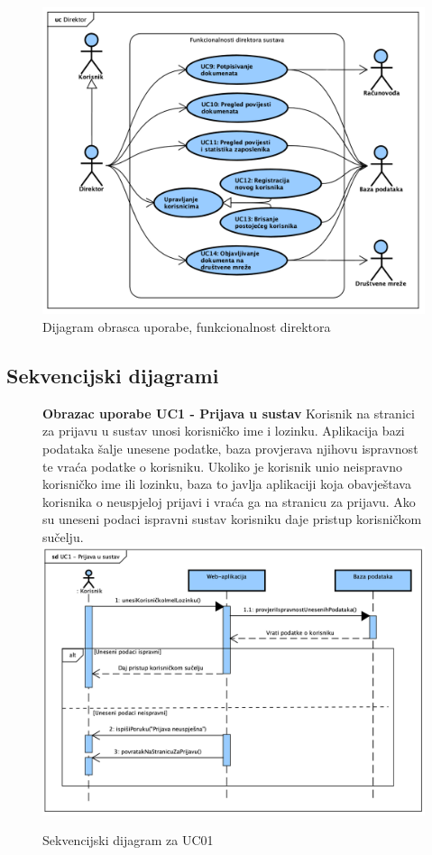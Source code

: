 					\begin{figure}[H]
						\includegraphics[width=\textwidth]{slike/UseCase_Direktor.png}
						\caption{Dijagram obrasca uporabe, funkcionalnost direktora}
						\label{fig:usecase_direktor}
					\end{figure}
				\eject{}
				
			\subsection{Sekvencijski dijagrami}

				\begin{figure}[H]
					\textbf{Obrazac uporabe UC1 - Prijava u sustav}
					\newline
					Korisnik na stranici za prijavu u sustav unosi korisničko ime i lozinku. Aplikacija bazi podataka šalje unesene podatke, baza provjerava njihovu ispravnost te vraća podatke o korisniku. Ukoliko je korisnik unio neispravno
					korisničko ime ili lozinku, baza to javlja aplikaciji koja obavještava korisnika o neuspjeloj prijavi i vraća ga na stranicu za prijavu. Ako su uneseni podaci ispravni sustav korisniku daje pristup korisničkom sučelju.
					\newline
					\includegraphics[width=\textwidth]{slike/Sequence_UC01.png}
					\caption{Sekvencijski dijagram za UC01}
					\label{fig:sequence_UC01}
				\end{figure}

